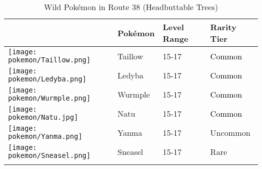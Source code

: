 \begin{longtable}{||l l l l||}%
\hline%
\rowcolor{GroundColor}%
&Pokémon&Level Range&Rarity Tier\\%
\hline%
\endhead%
\hline%
\rowcolor{GroundColor}%
\texttt{[image: pokemon/Taillow.png]}&Taillow&15{-}17&\textcolor{black}{%
Common%
}\\%
\hline%
\rowcolor{GroundColor}%
\texttt{[image: pokemon/Ledyba.png]}&Ledyba&15{-}17&\textcolor{black}{%
Common%
}\\%
\hline%
\rowcolor{GroundColor}%
\texttt{[image: pokemon/Wurmple.png]}&Wurmple&15{-}17&\textcolor{black}{%
Common%
}\\%
\hline%
\rowcolor{GroundColor}%
\texttt{[image: pokemon/Natu.jpg]}&Natu&15{-}17&\textcolor{black}{%
Common%
}\\%
\hline%
\rowcolor{GroundColor}%
\texttt{[image: pokemon/Yanma.png]}&Yanma&15{-}17&\textcolor{OliveGreen}{%
Uncommon%
}\\%
\hline%
\rowcolor{GroundColor}%
\texttt{[image: pokemon/Sneasel.png]}&Sneasel&15{-}17&\textcolor{RedOrange}{%
Rare%
}\\%
\hline%
\caption{Wild Pokémon in Route 38 (Headbuttable Trees)}%
\label{tab:Route38HeadbuttableTrees}%
\end{longtable}
